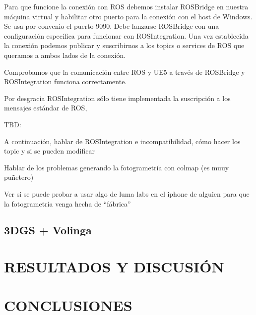 \documentclass[a4paper, 12pt, spanish, twoside]{article}
\begin{document}
Para que funcione la conexión con ROS debemos instalar ROSBridge en nuestra máquina virtual y habilitar otro puerto para la conexión con el host de Windows. Se usa por convenio el puerto 9090. Debe lanzarse ROSBridge con una configuración específica para funcionar con ROSIntegration. Una vez establecida la conexión podemos publicar y suscribirnos a los topics o services de ROS que queramos a ambos lados de la conexión.

Comprobamos que la comunicación entre ROS y UE5 a través de ROSBridge y ROSIntegration funciona correctamente.

Por desgracia ROSIntegration sólo tiene implementada la suscripción a los mensajes estándar de ROS,

TBD:

A continuación, hablar de ROSIntegration e incompatibilidad, cómo hacer los topic y si se pueden modificar

Hablar de los problemas generando la fotogrametría con colmap (es muuy puñetero)

Ver si se puede probar a usar algo de luma labs en el iphone de alguien para que la fotogrametría venga hecha de “fábrica”

\subsection{3DGS + Volinga}

\clearpage





\newpage
\section{RESULTADOS Y DISCUSIÓN} \label{sec:resultados_y_discusion}

\clearpage





\newpage
\section{CONCLUSIONES} \label{sec:conclusiones}
\end{document}
